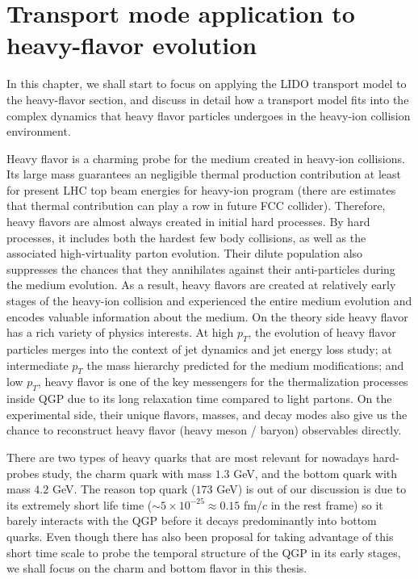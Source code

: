 \chapter{Transport mode application to heavy-flavor evolution}
In this chapter, we shall start to focus on applying the LIDO transport model to the heavy-flavor section, and discuss in detail how a transport model fits into the complex dynamics that heavy flavor particles undergoes in the heavy-ion collision environment.

Heavy flavor is a charming probe for the medium created in heavy-ion collisions. 
Its large mass guarantees an negligible thermal production contribution at least for present LHC top beam energies for heavy-ion program (there are estimates that thermal contribution can play a row in future FCC collider).
Therefore, heavy flavors are almost always created in initial hard processes. 
By hard processes, it includes both the hardest few body collisions, as well as the associated high-virtuality parton evolution.
Their dilute population also suppresses the chances that they annihilates against their anti-particles during the medium evolution.
As a result, heavy flavors are created at relatively early stages of the heavy-ion collision and experienced the entire medium evolution and encodes valuable information about the medium.
On the theory side heavy flavor has a rich variety of physics interests. 
At high $p_T$, the evolution of heavy flavor particles merges into the context of jet dynamics and jet energy loss study; at intermediate $p_T$ the mass hierarchy predicted for the medium modifications;
and low $p_T$, heavy flavor is one of the key messengers for the thermalization processes inside QGP due to its long relaxation time compared to light partons.
On the experimental side, their unique flavors, masses, and decay modes also give us the chance to reconstruct heavy flavor (heavy meson / baryon) observables directly.

There are two types of heavy quarks that are most relevant for nowadays hard-probes study, the charm quark with mass $1.3$ GeV, and the bottom quark with mass $4.2$ GeV.
The reason top quark ($173$ GeV) is out of our discussion is due to its extremely short life time ($\sim 5\times 10^{-25} \approx 0.15$  fm/$c$ in the rest frame) so it barely interacts with the QGP before it decays predominantly into bottom quarks.
Even though there has also been proposal for taking advantage of this short time scale to probe the temporal structure of the QGP in its early stages, we shall focus on the charm and bottom flavor in this thesis.

